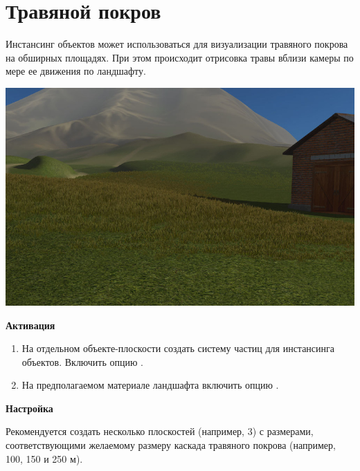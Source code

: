 \documentclass[a4paper,12pt,oneside]{sphinxmanual}
\begin{document}
\section{Травяной покров}
\label{particles_instancing:id3}\label{particles_instancing:particles-grass}
Инстансинг объектов может использоваться для визуализации травяного покрова на обширных площадях. При этом происходит отрисовка травы вблизи камеры по мере ее движения по ландшафту.

{\hfill\includegraphics[width=1.000\linewidth]{dynamic_grass.jpg}\hfill}

\begin{DUlineblock}{0em}
\item[] 
\end{DUlineblock}

\textbf{Активация}
\begin{enumerate}
\item {} 
На отдельном объекте-плоскости создать систему частиц для инстансинга объектов. Включить опцию .

\item {} 
На предполагаемом материале ландшафта включить опцию .

\end{enumerate}

\textbf{Настройка}

Рекомендуется создать несколько плоскостей (например, 3) с размерами, соответствующими желаемому размеру каскада травяного покрова (например, 100, 150 и 250 м).
\end{document}

